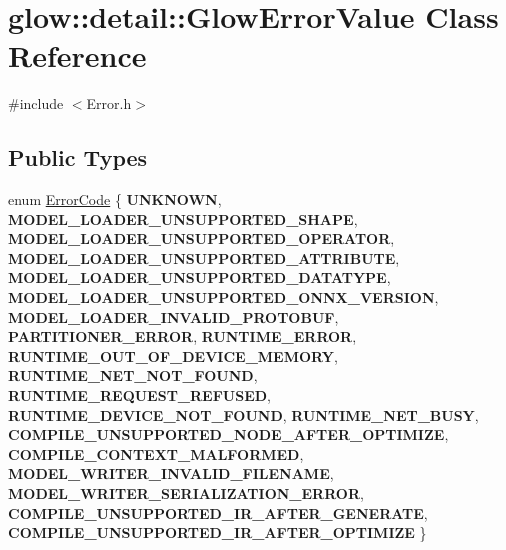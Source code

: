 \hypertarget{classglow_1_1detail_1_1_glow_error_value}{}\section{glow\+:\+:detail\+:\+:Glow\+Error\+Value Class Reference}
\label{classglow_1_1detail_1_1_glow_error_value}


{\ttfamily \#include $<$Error.\+h$>$}

\subsection*{Public Types}
\begin{DoxyCompactItemize}
\item 
enum \hyperlink{classglow_1_1detail_1_1_glow_error_value_a0c0ed8bba0a9859c023dd4b9b5233c37}{Error\+Code} \{ \newline
{\bfseries U\+N\+K\+N\+O\+WN}, 
{\bfseries M\+O\+D\+E\+L\+\_\+\+L\+O\+A\+D\+E\+R\+\_\+\+U\+N\+S\+U\+P\+P\+O\+R\+T\+E\+D\+\_\+\+S\+H\+A\+PE}, 
{\bfseries M\+O\+D\+E\+L\+\_\+\+L\+O\+A\+D\+E\+R\+\_\+\+U\+N\+S\+U\+P\+P\+O\+R\+T\+E\+D\+\_\+\+O\+P\+E\+R\+A\+T\+OR}, 
{\bfseries M\+O\+D\+E\+L\+\_\+\+L\+O\+A\+D\+E\+R\+\_\+\+U\+N\+S\+U\+P\+P\+O\+R\+T\+E\+D\+\_\+\+A\+T\+T\+R\+I\+B\+U\+TE}, 
\newline
{\bfseries M\+O\+D\+E\+L\+\_\+\+L\+O\+A\+D\+E\+R\+\_\+\+U\+N\+S\+U\+P\+P\+O\+R\+T\+E\+D\+\_\+\+D\+A\+T\+A\+T\+Y\+PE}, 
{\bfseries M\+O\+D\+E\+L\+\_\+\+L\+O\+A\+D\+E\+R\+\_\+\+U\+N\+S\+U\+P\+P\+O\+R\+T\+E\+D\+\_\+\+O\+N\+N\+X\+\_\+\+V\+E\+R\+S\+I\+ON}, 
{\bfseries M\+O\+D\+E\+L\+\_\+\+L\+O\+A\+D\+E\+R\+\_\+\+I\+N\+V\+A\+L\+I\+D\+\_\+\+P\+R\+O\+T\+O\+B\+UF}, 
{\bfseries P\+A\+R\+T\+I\+T\+I\+O\+N\+E\+R\+\_\+\+E\+R\+R\+OR}, 
\newline
{\bfseries R\+U\+N\+T\+I\+M\+E\+\_\+\+E\+R\+R\+OR}, 
{\bfseries R\+U\+N\+T\+I\+M\+E\+\_\+\+O\+U\+T\+\_\+\+O\+F\+\_\+\+D\+E\+V\+I\+C\+E\+\_\+\+M\+E\+M\+O\+RY}, 
{\bfseries R\+U\+N\+T\+I\+M\+E\+\_\+\+N\+E\+T\+\_\+\+N\+O\+T\+\_\+\+F\+O\+U\+ND}, 
{\bfseries R\+U\+N\+T\+I\+M\+E\+\_\+\+R\+E\+Q\+U\+E\+S\+T\+\_\+\+R\+E\+F\+U\+S\+ED}, 
\newline
{\bfseries R\+U\+N\+T\+I\+M\+E\+\_\+\+D\+E\+V\+I\+C\+E\+\_\+\+N\+O\+T\+\_\+\+F\+O\+U\+ND}, 
{\bfseries R\+U\+N\+T\+I\+M\+E\+\_\+\+N\+E\+T\+\_\+\+B\+U\+SY}, 
{\bfseries C\+O\+M\+P\+I\+L\+E\+\_\+\+U\+N\+S\+U\+P\+P\+O\+R\+T\+E\+D\+\_\+\+N\+O\+D\+E\+\_\+\+A\+F\+T\+E\+R\+\_\+\+O\+P\+T\+I\+M\+I\+ZE}, 
{\bfseries C\+O\+M\+P\+I\+L\+E\+\_\+\+C\+O\+N\+T\+E\+X\+T\+\_\+\+M\+A\+L\+F\+O\+R\+M\+ED}, 
\newline
{\bfseries M\+O\+D\+E\+L\+\_\+\+W\+R\+I\+T\+E\+R\+\_\+\+I\+N\+V\+A\+L\+I\+D\+\_\+\+F\+I\+L\+E\+N\+A\+ME}, 
{\bfseries M\+O\+D\+E\+L\+\_\+\+W\+R\+I\+T\+E\+R\+\_\+\+S\+E\+R\+I\+A\+L\+I\+Z\+A\+T\+I\+O\+N\+\_\+\+E\+R\+R\+OR}, 
{\bfseries C\+O\+M\+P\+I\+L\+E\+\_\+\+U\+N\+S\+U\+P\+P\+O\+R\+T\+E\+D\+\_\+\+I\+R\+\_\+\+A\+F\+T\+E\+R\+\_\+\+G\+E\+N\+E\+R\+A\+TE}, 
{\bfseries C\+O\+M\+P\+I\+L\+E\+\_\+\+U\+N\+S\+U\+P\+P\+O\+R\+T\+E\+D\+\_\+\+I\+R\+\_\+\+A\+F\+T\+E\+R\+\_\+\+O\+P\+T\+I\+M\+I\+ZE}
 \}
\end{DoxyCompactItemize}
